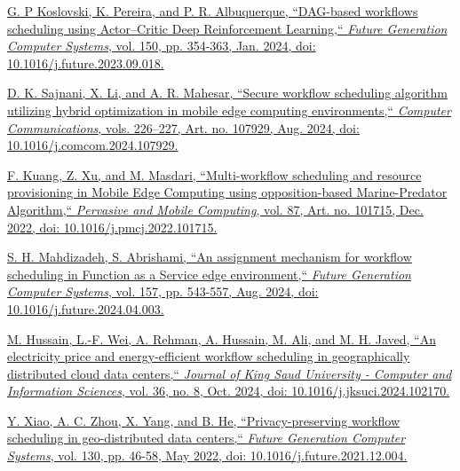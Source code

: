 \documentclass[a4paper, final]{article}
\begin{document}
\cleardoublepage
{}
\newpage
\begin{thebibliography}{0}
	\href{https://doi.org/10.1016/j.future.2023.09.018}{
    G. P Koslovski, K. Pereira, and P. R. Albuquerque, 
    ``DAG-based workflows scheduling using Actor–Critic Deep Reinforcement Learning,``
    \textit{Future Generation Computer Systems}, vol. 150, pp. 354-363, Jan. 2024, 
    doi: 10.1016/j.future.2023.09.018.
    }

	\href{https://doi.org/10.1016/j.comcom.2024.107929}{
    D. K. Sajnani, X. Li, and A. R. Mahesar,
    ``Secure workflow scheduling algorithm utilizing hybrid optimization in mobile edge computing environments,``
    \textit{Computer Communications}, vols. 226–227, Art. no. 107929, Aug. 2024,
    doi: 10.1016/j.comcom.2024.107929.
    }

	\href{https://doi.org/10.1016/j.pmcj.2022.101715}{
    F. Kuang, Z. Xu, and M. Masdari,
    ``Multi-workflow scheduling and resource provisioning in Mobile Edge Computing using opposition-based
    Marine-Predator Algorithm,``
    \textit{Pervasive and Mobile Computing}, vol. 87, Art. no. 101715, Dec. 2022,
    doi: 10.1016/j.pmcj.2022.101715.
    }
    
	\href{https://doi.org/10.1016/j.future.2024.04.003}{
    S. H. Mahdizadeh, S. Abrishami,
    ``An assignment mechanism for workflow scheduling in Function as a Service edge environment,``
    \textit{Future Generation Computer Systems}, vol. 157, pp. 543-557, Aug. 2024,
    doi: 10.1016/j.future.2024.04.003.
    }

    \href{https://doi.org/10.1016/j.jksuci.2024.102170}{
    M. Hussain, L.-F. Wei, A. Rehman, A. Hussain, M. Ali, and M. H. Javed,
    ``An electricity price and energy-efficient workflow scheduling in geographically distributed cloud data
    centers,``
    \textit{Journal of King Saud University - Computer and Information Sciences}, vol. 36, no. 8, Oct. 2024,
    doi: 10.1016/j.jksuci.2024.102170.
    }
    
    \href{https://doi.org/10.1016/j.future.2021.12.004}{
    Y. Xiao, A. C. Zhou, X. Yang, and B. He,
    ``Privacy-preserving workflow scheduling in geo-distributed data centers,``
    \textit{Future Generation Computer Systems}, vol. 130, pp. 46-58, May 2022,
    doi: 10.1016/j.future.2021.12.004.
    }


\end{thebibliography}
\end{document}
